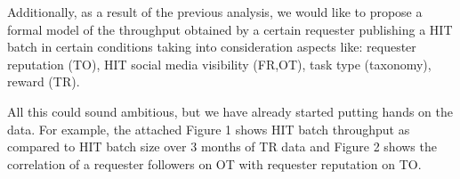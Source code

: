 \documentclass{sig-alternate}
\begin{document}
Additionally, as a result of the previous analysis, we would like to propose a formal model of the throughput obtained by a certain requester publishing a HIT batch in certain conditions taking into consideration aspects like: requester reputation (TO), HIT social media visibility (FR,OT), task type (taxonomy), reward (TR).

All this could sound ambitious, but we have already started putting hands on the data. For example, the attached Figure 1 shows HIT batch throughput as compared to HIT batch size over 3 months of TR data and Figure 2 shows the correlation of a requester followers on OT with requester reputation on TO.

\end{document}

